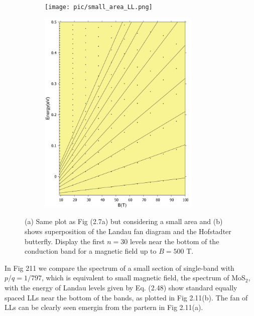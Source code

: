 \documentclass{report}
\begin{document}
\begin{figure}[htb]
	\centering
	\begin{subfigure}[b]{0.49\textwidth}
		\centering
		{\texttt{[image: pic/small\_area\_LL.png]}}
	\end{subfigure}
	\begin{subfigure}[b]{0.49\textwidth}
		\centering
		\includegraphics[width=0.85\textwidth,height=1.2\linewidth]{pic/landaulevel_h0_q_797.pdf}
	\end{subfigure}
	\caption[Exploration Landau levels in Hofstadter butterfly.]{
		(a) Same plot as Fig (2.7a) but considering a small area and (b) shows superposition of the Landau fan diagram and the Hofstadter butterfly. Display the first $n = 30$ levels near the bottom of the conduction band for a magnetic field up to $B = 500$ T.
	}
\end{figure}

In Fig 211 we compare the spectrum of a small section of single-band with $p / q = 1 / 797$, which is equivalent to small magnetic field, the spectrum of MoS$_{2}$, with the energy of Landau levels given by Eq. (2.48) show standard equally spaced \ac{LLs} \cite{Shoenberg_1984,singleton2001band,blundell2001magnetism,kittel1987quantum} near the bottom of the bands, as plotted in Fig 2.11(b). The fan of \ac{LLs} can be clearly seen emergin from the partern in Fig 2.11(a).
\end{document}

